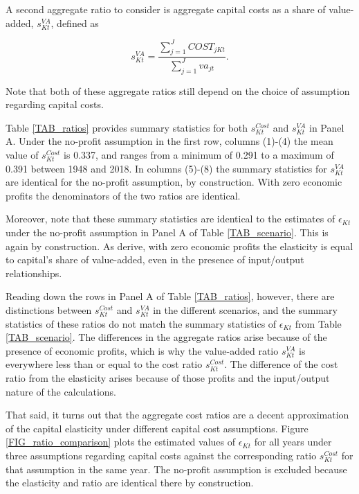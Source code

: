 \documentclass[11pt]{article}
\begin{document}
A second aggregate ratio to consider is aggregate capital costs as a share of value-added, $s^{VA}_{Kt}$, defined as

\begin{equation}
	s^{VA}_{Kt} = \frac{\sum_{j=1}^{J} COST_{jKt}}{\sum_{j=1}^{J} va_{jt}}. \label{EQ_sva}
\end{equation}

Note that both of these aggregate ratios still depend on the choice of assumption regarding capital costs.

Table \ref{TAB_ratios} provides summary statistics for both $s^{Cost}_{Kt}$ and $s^{VA}_{Kt}$ in Panel A. Under the no-profit assumption in the first row, columns (1)-(4) the mean value of $s^{Cost}_{Kt}$ is 0.337, and ranges from a minimum of 0.291 to a maximum of 0.391 between 1948 and 2018. In columns (5)-(8) the summary statistics for $s^{VA}_{Kt}$ are identical for the no-profit assumption, by construction. With zero economic profits the denominators of the two ratios are identical. 

Moreover, note that these summary statistics are identical to the estimates of $\epsilon_{Kt}$ under the no-profit assumption in Panel A of Table \ref{TAB_scenario}. This is again by construction. As \cite{bfshortnote,bfprodge} derive, with zero economic profits the elasticity is equal to capital's share of value-added, even in the presence of input/output relationships. 

Reading down the rows in Panel A of Table \ref{TAB_ratios}, however, there are distinctions between $s^{Cost}_{Kt}$ and $s^{VA}_{Kt}$ in the different scenarios, and the summary statistics of these ratios do not match the summary statistics of $\epsilon_{Kt}$ from Table \ref{TAB_scenario}. The differences in the aggregate ratios arise because of the presence of economic profits, which is why the value-added ratio $s^{VA}_{Kt}$ is everywhere less than or equal to the cost ratio $s^{Cost}_{Kt}$. The difference of the cost ratio from the elasticity arises because of those profits and the input/output nature of the calculations.

That said, it turns out that the aggregate cost ratios are a decent approximation of the capital elasticity under different capital cost assumptions. Figure \ref{FIG_ratio_comparison} plots the estimated values of $\epsilon_{Kt}$ for all years under three assumptions regarding capital costs against the corresponding ratio $s^{Cost}_{Kt}$ for that assumption in the same year. The no-profit assumption is excluded because the elasticity and ratio are identical there by construction. 
\end{document}
